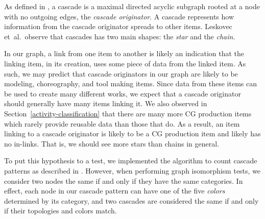 \documentclass[10pt, a4paper]{article}
\newcommand{\etal}{{et~al.}}
\begin{document}
As defined in \cite{Gruhl:2004}, a cascade is a maximal directed acyclic subgraph rooted at a node with no outgoing edges, the \emph{cascade originator}. A cascade represents how information from the cascade originator spreads to other items. Leskovec \etal~observe that cascades has two main shapes: the \emph{star} and the \emph{chain}.

In our graph, a link from one item to another is likely an indication that the linking item, in its creation, uses some piece of data from the linked item. As such, we may predict that cascade originators in our graph are likely to be modeling, choreography, and tool making items. Since data from these items can be used to create many different works, we expect that a cascade originator should generally have many items linking it. We also observed in Section~\ref{activity-classification} that there are many more CG production items which rarely provide reusable data than those that do. As a result, an item linking to a cascade originator is likely to be a CG production item and likely has no in-links. That is, we should see more stars than chains in general.

To put this hypothesis to a test, we implemented the algorithm to count cascade patterns as described in \cite{Leskovec:2006}. However, when performing graph isomorphism tests, we consider two nodes the same if and only if they have the same categories. In effect, each node in our cascade pattern can have one of the five \emph{colors} determined by its category, and two cascades are considered the same if and only if their topologies and colors match.
\end{document}

